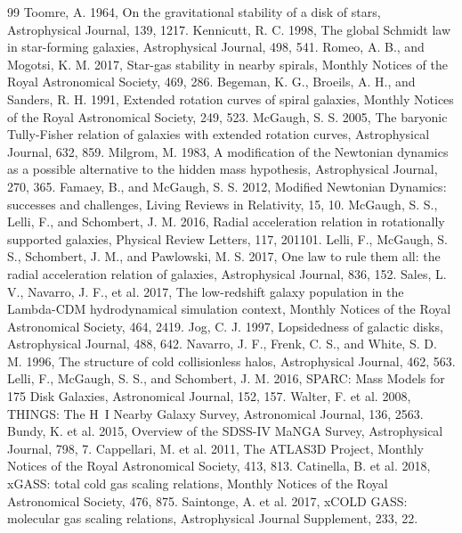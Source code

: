 \documentclass[11pt]{article}
\begin{document}
\begin{thebibliography}{99}
 Toomre, A. 1964, On the gravitational stability of a disk of stars, Astrophysical Journal, 139, 1217.
 Kennicutt, R. C. 1998, The global Schmidt law in star-forming galaxies, Astrophysical Journal, 498, 541.
 Romeo, A. B., and Mogotsi, K. M. 2017, Star-gas stability in nearby spirals, Monthly Notices of the Royal Astronomical Society, 469, 286.
 Begeman, K. G., Broeils, A. H., and Sanders, R. H. 1991, Extended rotation curves of spiral galaxies, Monthly Notices of the Royal Astronomical Society, 249, 523.
 McGaugh, S. S. 2005, The baryonic Tully-Fisher relation of galaxies with extended rotation curves, Astrophysical Journal, 632, 859.
 Milgrom, M. 1983, A modification of the Newtonian dynamics as a possible alternative to the hidden mass hypothesis, Astrophysical Journal, 270, 365.
 Famaey, B., and McGaugh, S. S. 2012, Modified Newtonian Dynamics: successes and challenges, Living Reviews in Relativity, 15, 10.
 McGaugh, S. S., Lelli, F., and Schombert, J. M. 2016, Radial acceleration relation in rotationally supported galaxies, Physical Review Letters, 117, 201101.
 Lelli, F., McGaugh, S. S., Schombert, J. M., and Pawlowski, M. S. 2017, One law to rule them all: the radial acceleration relation of galaxies, Astrophysical Journal, 836, 152.
 Sales, L. V., Navarro, J. F., et al. 2017, The low-redshift galaxy population in the Lambda-CDM hydrodynamical simulation context, Monthly Notices of the Royal Astronomical Society, 464, 2419.
 Jog, C. J. 1997, Lopsidedness of galactic disks, Astrophysical Journal, 488, 642.
 Navarro, J. F., Frenk, C. S., and White, S. D. M. 1996, The structure of cold collisionless halos, Astrophysical Journal, 462, 563.
 Lelli, F., McGaugh, S. S., and Schombert, J. M. 2016, SPARC: Mass Models for 175 Disk Galaxies, Astronomical Journal, 152, 157.
 Walter, F. et al. 2008, THINGS: The H~I Nearby Galaxy Survey, Astronomical Journal, 136, 2563.
 Bundy, K. et al. 2015, Overview of the SDSS-IV MaNGA Survey, Astrophysical Journal, 798, 7.
 Cappellari, M. et al. 2011, The ATLAS3D Project, Monthly Notices of the Royal Astronomical Society, 413, 813.
 Catinella, B. et al. 2018, xGASS: total cold gas scaling relations, Monthly Notices of the Royal Astronomical Society, 476, 875.
 Saintonge, A. et al. 2017, xCOLD GASS: molecular gas scaling relations, Astrophysical Journal Supplement, 233, 22.
\end{thebibliography}
\end{document}
